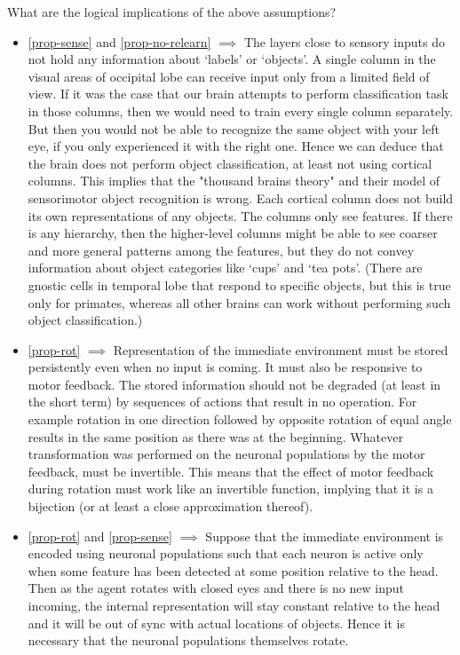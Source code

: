 \documentclass[12pt]{article}
\begin{document}
What are the logical implications of the above assumptions?

\begin{itemize}
	\item \ref{prop-sense} and \ref{prop-no-relearn} $\implies$ The layers close to sensory inputs do not hold any information about `labels' or `objects'. A single column in the visual areas of occipital lobe can receive input only from a limited field of view. If it was the case that our brain attempts to perform classification task in those columns, then we would need to train every single column separately. But then you would not be able to recognize the same object with your left eye, if you only experienced it with the right one. Hence  we can deduce that the brain does not perform object classification, at least not using cortical columns. This implies that the "thousand brains theory" and their model of sensorimotor object recognition is wrong. Each cortical column does not build its own representations of any objects. The columns only see features. If there is any hierarchy, then the higher-level columns might be able to see coarser and more general patterns among the features, but they do not convey information about object categories like `cups' and `tea pots'. (There are gnostic cells in temporal lobe that respond to specific objects, but this is true only for primates, whereas all other brains can work without performing such object classification.)
	\item \ref{prop-rot} $\implies$ Representation of the immediate environment must be stored persistently even when no input is coming. It must also be responsive to motor feedback. The stored information should not be degraded (at least in the short term) by sequences of actions that result in no operation. For example rotation in one direction followed by opposite rotation of equal angle results in the same position as there was at the beginning. Whatever transformation was performed on the neuronal populations by the motor feedback, must be invertible. This means that the effect of motor feedback during rotation must work like an invertible function, implying that it is a bijection (or at least a close approximation thereof).
    \item \ref{prop-rot} and \ref{prop-sense} $\implies$ Suppose that the immediate environment is encoded using neuronal populations such that each neuron is active only when some feature has been detected at some position relative to the head. Then as the agent rotates with closed eyes and there is no new input incoming, the internal representation will stay constant relative to the head and it will be out of sync with actual locations of objects. Hence it is necessary that the  neuronal populations themselves rotate. 
\end{itemize}

    
\end{document}
